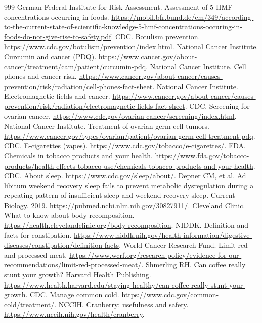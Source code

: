 \documentclass[11pt,oneside]{book}
\begin{document}
\begin{thebibliography}{999}
German Federal Institute for Risk Assessment. Assessment of 5-HMF concentrations occurring in foods. \url{https://mobil.bfr.bund.de/cm/349/according-to-the-current-state-of-scientific-knowledge-5-hmf-concentrations-occuring-in-foods-do-not-give-rise-to-safety.pdf}.
CDC. Botulism prevention. \url{https://www.cdc.gov/botulism/prevention/index.html}.
National Cancer Institute. Curcumin and cancer (PDQ). \url{https://www.cancer.gov/about-cancer/treatment/cam/patient/curcumin-pdq}.
National Cancer Institute. Cell phones and cancer risk. \url{https://www.cancer.gov/about-cancer/causes-prevention/risk/radiation/cell-phones-fact-sheet}.
National Cancer Institute. Electromagnetic fields and cancer. \url{https://www.cancer.gov/about-cancer/causes-prevention/risk/radiation/electromagnetic-fields-fact-sheet}.
CDC. Screening for ovarian cancer. \url{https://www.cdc.gov/ovarian-cancer/screening/index.html}.
National Cancer Institute. Treatment of ovarian germ cell tumors. \url{https://www.cancer.gov/types/ovarian/patient/ovarian-germ-cell-treatment-pdq}.
CDC. E-cigarettes (vapes). \url{https://www.cdc.gov/tobacco/e-cigarettes/}.
FDA. Chemicals in tobacco products and your health. \url{https://www.fda.gov/tobacco-products/health-effects-tobacco-use/chemicals-tobacco-products-and-your-health}.
CDC. About sleep. \url{https://www.cdc.gov/sleep/about/}.
Depner CM, et al. Ad libitum weekend recovery sleep fails to prevent metabolic dysregulation during a repeating pattern of insufficient sleep and weekend recovery sleep. Current Biology. 2019. \url{https://pubmed.ncbi.nlm.nih.gov/30827911/}.
Cleveland Clinic. What to know about body recomposition. \url{https://health.clevelandclinic.org/body-recomposition}.
NIDDK. Definition and facts for constipation. \url{https://www.niddk.nih.gov/health-information/digestive-diseases/constipation/definition-facts}.
World Cancer Research Fund. Limit red and processed meat. \url{https://www.wcrf.org/research-policy/evidence-for-our-recommendations/limit-red-processed-meat/}.
Shmerling RH. Can coffee really stunt your growth? Harvard Health Publishing. \url{https://www.health.harvard.edu/staying-healthy/can-coffee-really-stunt-your-growth}.
CDC. Manage common cold. \url{https://www.cdc.gov/common-cold/treatment/}.
NCCIH. Cranberry: usefulness and safety. \url{https://www.nccih.nih.gov/health/cranberry}.

\end{thebibliography}
\end{document}
